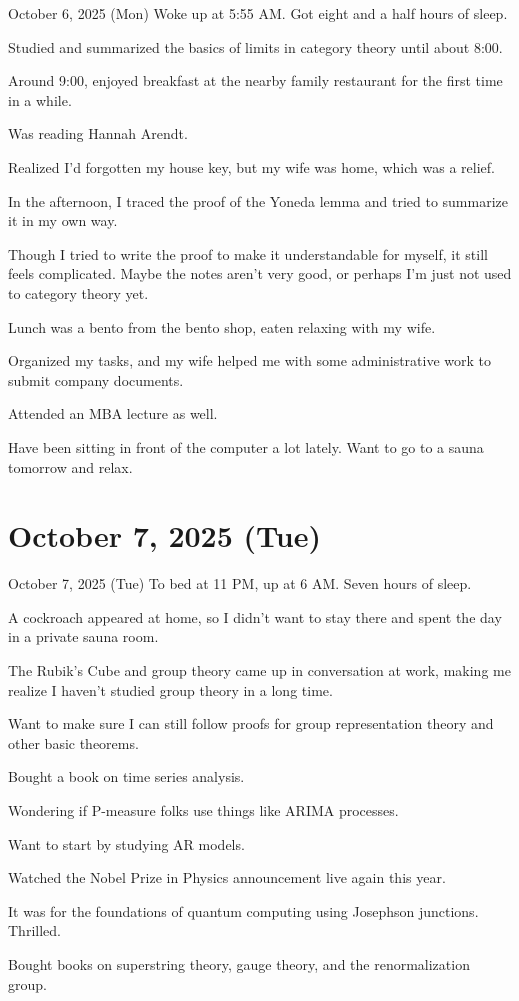 \documentclass[dvipdfmx, autodetect-engine, aspectratio=169, 10.5pt]{beamer}
\begin{document}
\begin{frame}{October 6, 2025 (Mon)}
\scriptsize
Woke up at 5:55 AM. Got eight and a half hours of sleep.

Studied and summarized the basics of limits in category theory until about 8:00.

Around 9:00, enjoyed breakfast at the nearby family restaurant for the first time in a while.

Was reading Hannah Arendt.

Realized I'd forgotten my house key, but my wife was home, which was a relief.

In the afternoon, I traced the proof of the Yoneda lemma and tried to summarize it in my own way.

Though I tried to write the proof to make it understandable for myself, it still feels complicated. Maybe the notes aren't very good, or perhaps I'm just not used to category theory yet.

Lunch was a bento from the bento shop, eaten relaxing with my wife.

Organized my tasks, and my wife helped me with some administrative work to submit company documents.

Attended an MBA lecture as well.

Have been sitting in front of the computer a lot lately. Want to go to a sauna tomorrow and relax.
\end{frame}

\section{October 7, 2025 (Tue)}

\begin{frame}{October 7, 2025 (Tue)}
To bed at 11 PM, up at 6 AM. Seven hours of sleep.

A cockroach appeared at home, so I didn't want to stay there and spent the day in a private sauna room.

The Rubik's Cube and group theory came up in conversation at work, making me realize I haven't studied group theory in a long time.

Want to make sure I can still follow proofs for group representation theory and other basic theorems.

Bought a book on time series analysis.

Wondering if P-measure folks use things like ARIMA processes.

Want to start by studying AR models.

Watched the Nobel Prize in Physics announcement live again this year.

It was for the foundations of quantum computing using Josephson junctions. Thrilled.

Bought books on superstring theory, gauge theory, and the renormalization group.
\end{frame}
\end{document}
